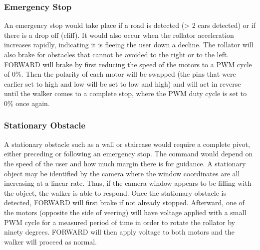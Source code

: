 \subsubsection{Emergency Stop}
\noindent An emergency stop would take place if a road is detected (> 2 cars detected) or if there is a drop off (cliff). It would also occur when the rollator acceleration increases rapidly, indicating it is fleeing the user down a decline. The rollator will also brake for obstacles that cannot be avoided to the right or to the left. FORWARD will brake by first reducing the speed of the motors to a PWM cycle of 0\%. Then the polarity of each motor will be swapped (the pins that were earlier set to high and low will be set to low and high) and will act in reverse until the walker comes to a complete stop, where the PWM duty cycle is set to 0\% once again.\\

\subsubsection{Stationary Obstacle}
\noindent A stationary obstacle such as a wall or staircase would require a complete pivot, either preceding or following an emergency stop. The command would depend on the speed of the user and how much margin there is for guidance. A stationary object may be identified by the camera where the window coordinates are all increasing at a linear rate. Thus, if the camera window appears to be filling with the object, the walker is able to respond. Once the stationary obstacle is detected, FORWARD will first brake if not already stopped. Afterward, one of the motors (opposite the side of veering) will have voltage applied with a small PWM cycle for a measured period of time in order to rotate the rollator by ninety degrees. FORWARD will then apply voltage to both motors and the walker will proceed as normal.\\

